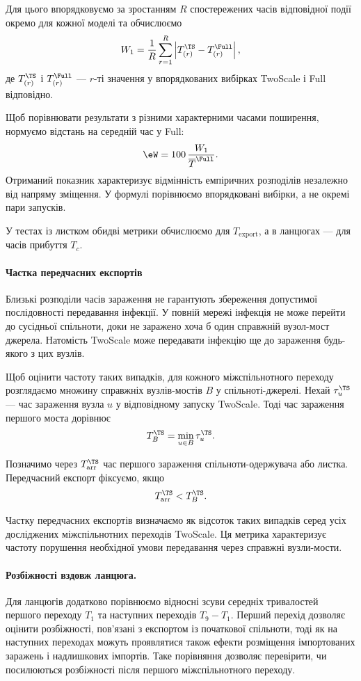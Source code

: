 Для цього впорядковуємо за зростанням
$R$ спостережених часів відповідної події
окремо для кожної моделі та обчислюємо
\[
W_1 =
\frac{1}{R}
\sum_{r=1}^{R}
\left|
T_{(r)}^{\TS}-T_{(r)}^{\Full}
\right|,
\]
де $T_{(r)}^{\TS}$ і $T_{(r)}^{\Full}$ ---
$r$-ті значення у впорядкованих вибірках
TwoScale і Full відповідно.

Щоб порівнювати результати з різними
характерними часами поширення,
нормуємо відстань на середній час у Full:
\[
\eW =
100\,\frac{W_1}{\overline{T}^{\Full}}.
\]
Отриманий показник характеризує
відмінність емпіричних розподілів
незалежно від напряму зміщення.
У формулі порівнюємо впорядковані
вибірки, а не окремі пари запусків.

У тестах із листком обидві метрики
обчислюємо для $T_{\mathrm{export}}$,
а в ланцюгах --- для часів прибуття $T_c$.

\paragraph{Частка передчасних експортів}
Близькі розподіли часів зараження
не гарантують збереження допустимої
послідовності передавання інфекції.
У повній мережі інфекція не може перейти
до сусідньої спільноти, доки не заражено
хоча б один справжній вузол-мост джерела.
Натомість TwoScale може передавати інфекцію
ще до зараження будь-якого з цих вузлів.


Щоб оцінити частоту таких випадків,
для кожного міжспільнотного переходу
розглядаємо множину справжніх вузлів-мостів
$B$ у спільноті-джерелі.
Нехай $\tau_u^{\TS}$ --- час зараження вузла $u$
у відповідному запуску TwoScale.
Тоді час зараження першого моста дорівнює
\[
T_B^{\TS}=\min_{u\in B}\tau_u^{\TS}.
\]

Позначимо через $T_{\mathrm{arr}}^{\TS}$
час першого зараження спільноти-одержувача
або листка. Передчасний експорт фіксуємо,
якщо
\[
T_{\mathrm{arr}}^{\TS}<T_B^{\TS}.
\]

Частку передчасних експортів визначаємо
як відсоток таких випадків серед усіх
досліджених міжспільнотних переходів TwoScale.
Ця метрика характеризує частоту порушення
необхідної умови передавання через
справжні вузли-мости.



\paragraph{Розбіжності вздовж ланцюга.}
Для ланцюгів додатково порівнюємо відносні
зсуви середніх тривалостей першого переходу
$T_1$ та наступних переходів $T_9-T_1$.
Перший перехід дозволяє оцінити розбіжності,
пов'язані з експортом із початкової спільноти,
тоді як на наступних переходах можуть
проявлятися також ефекти розміщення
імпортованих заражень і надлишкових імпортів.
Таке порівняння дозволяє перевірити,
чи посилюються розбіжності після першого
міжспільнотного переходу.




